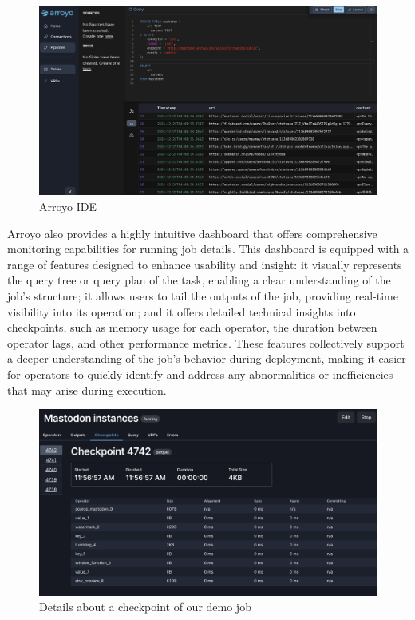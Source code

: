 \begin{figure}[H]
    \centering
    \includegraphics[width=\textwidth]{Images/arroyo_ide.png}
    \vspace{1em}
    \caption{Arroyo IDE}
    \label{fig:arroyo_ide}
\end{figure}

Arroyo also provides a highly intuitive dashboard that offers comprehensive monitoring capabilities
for running job details. This dashboard is equipped with a range of features designed to enhance
usability and insight: it visually represents the query tree or query plan of the task, enabling a
clear understanding of the job's structure; it allows users to tail the outputs of the job,
providing real-time visibility into its operation; and it offers detailed technical insights into
checkpoints, such as memory usage for each operator, the duration between operator lags, and other
performance metrics. These features collectively support a deeper understanding of the job's
behavior during deployment, making it easier for operators to quickly identify and address any
abnormalities or inefficiencies that may arise during execution.

\begin{figure}[H]
    \centering
    \includegraphics[width=\textwidth]{Images/arroyo_job_checkpoints.png}
    \vspace{1em}
    \caption{Details about a checkpoint of our demo job}
    \label{fig:arroyo_job_checkpoints}
\end{figure}


